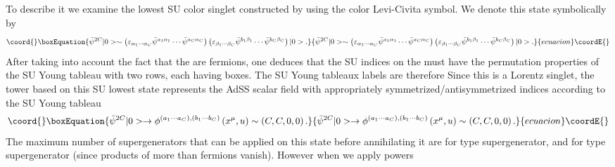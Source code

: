 \documentclass[a4paper,aps,preprint,nofootinbib]{revtex4}
\begin{document}
To describe it we examine the lowest SU\coordHE{} color singlet
constructed by using the color Levi-Civita symbol. We denote this state
symbolically by \coordHE{}%
\begin{equation}\coord{}\boxEquation{
\bar{\psi}^{2C}|0>\sim\left( \varepsilon_{\alpha_{1}\cdots\alpha_{C}}\bar{
\psi}^{a_{1}\alpha_{1}}\cdots\bar{\psi}^{a_{C}\alpha_{C}}\right) \left(
\varepsilon_{\beta_{1}\cdots\beta_{C}}\bar{\psi}^{b_{1}\beta_{1}}\cdots \bar{
\psi}^{b_{C}\beta_{C}}\right) |0>.  \label{bottom}
}{
\bar{\psi}^{2C}|0>\sim\left( \varepsilon_{\alpha_{1}\cdots\alpha_{C}}\bar{
\psi}^{a_{1}\alpha_{1}}\cdots\bar{\psi}^{a_{C}\alpha_{C}}\right) \left(
\varepsilon_{\beta_{1}\cdots\beta_{C}}\bar{\psi}^{b_{1}\beta_{1}}\cdots \bar{
\psi}^{b_{C}\beta_{C}}\right) |0>.  }{ecuacion}\coordE{}\end{equation}
After taking into account the fact that the \coordHE{} are
fermions, one deduces that the SU\myHighlight{$\left( 4\right) $}\coordHE{} indices on the \coordHE{} must have the permutation properties of the SU\myHighlight{$\left(
4\right) $}\coordHE{} Young tableau with two rows, each having \coordHE{} boxes. The SU\myHighlight{$\left(
4\right) $}\coordHE{} Young tableaux labels are therefore \coordHE{}
Since this is a Lorentz singlet, the tower based on this SU\coordHE{} lowest state represents the AdS\coordHE{}S\coordHE{} scalar field
with appropriately symmetrized/antisymmetrized indices according to the \coordHE{} SU\myHighlight{$\left( 4\right) $}\coordHE{} Young tableau
\begin{equation}\coord{}\boxEquation{
\bar{\psi}^{2C}|0>\rightarrow\phi^{(a_{1}\cdots a_{C}),(b_{1}\cdots
b_{C})}\left( x^{\mu},u\right) \sim\left( C,C,0,0\right) .
}{
\bar{\psi}^{2C}|0>\rightarrow\phi^{(a_{1}\cdots a_{C}),(b_{1}\cdots
b_{C})}\left( x^{\mu},u\right) \sim\left( C,C,0,0\right) .
}{ecuacion}\coordE{}\end{equation}
The maximum number of supergenerators that can be applied on this state
before annihilating it are \coordHE{} for type \coordHE{} supergenerator,
and \coordHE{} for type \coordHE{} supergenerator (since products of
more than \coordHE{} fermions \myHighlight{$\bar{\psi}$}\coordHE{} vanish). However when we apply powers
\end{document}
